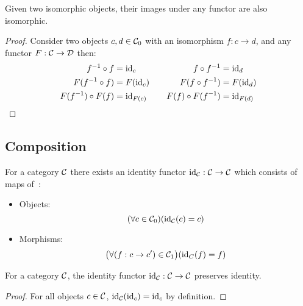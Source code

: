 \begin{theorem}\label{thm:isomorphism_functor}

  Given two isomorphic objects, their images under any functor are also
  isomorphic.

  \begin{proof}
    Consider two objects $c,d \in \mathcal{C}_0$ with an isomorphism $f: c\to d$, and any
    functor $F:\mathcal{C} \to \mathcal{D}$ then:
    \[
      \begin{aligned}
        f^{-1}\circ f &= \mathrm{id}_c\\
        F(f^{-1}\circ f) &= F(\mathrm{id}_c)\\
        F(f^{-1})\circ F(f) &= \mathrm{id}_{F(c)}
      \end{aligned}
      \qquad
      \begin{aligned}
        f \circ f^{-1} &= \mathrm{id}_d\\
        F(f \circ f^{-1}) &= F(\mathrm{id}_d)\\
        F(f) \circ F(f^{-1}) &= \mathrm{id}_{F(d)}
      \end{aligned}
    \]
  \end{proof}
\end{theorem}

\subsection{Composition}
\begin{definition}\label{def:id_functor}

  For a category $\mathcal{C}$ there exists an identity functor $\mathrm{id}_{\mathcal{C}}: \mathcal{C} \to \mathcal{C}$ which
  consists of maps of~\parencite[p.~27]{adamek_herrlich_strecker:joy_cats}:
  \begin{itemize}
    \item Objects:
      \[(\forall c \in \mathcal{C}_0)
        (\mathrm{id}_{\mathcal{C}}(c) = c)\]
    \item Morphisms:
      \[\big(\forall (f: c\to c') \in \mathcal{C}_1\big)
        (\mathrm{id}_C(f) = f)\]
  \end{itemize}
\end{definition}

\begin{theorem}
  For a category $\mathcal{C}$, the identity functor $\mathrm{id}_{\mathcal{C}}: \mathcal{C} \to \mathcal{C}$ preserves
  identity.

  \begin{proof}
    For all objects $c\in \mathcal{C}$, $\mathrm{id}_{\mathcal{C}}(\mathrm{id}_c) = \mathrm{id}_c$ by definition.
  \end{proof}
\end{theorem}

